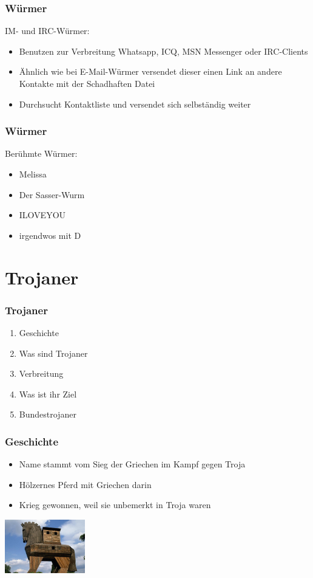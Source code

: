 \documentclass{beamer}
\begin{document}
\begin{frame}
	\frametitle{Würmer}
		\begin{block}{IM- und IRC-Würmer:}
			\begin{itemize}
				\item Benutzen zur Verbreitung Whatsapp, ICQ, MSN Messenger oder IRC-Clients
				\item Ähnlich wie bei E-Mail-Würmer versendet dieser einen Link an andere Kontakte mit der Schadhaften Datei
				\item Durchsucht Kontaktliste und versendet sich selbständig weiter
			\end{itemize}
		\end{block}
\end{frame}

\begin{frame}
	\frametitle{Würmer}
		\begin{block}{Berühmte Würmer:}
			\begin{itemize}
				\item Melissa
				\item Der Sasser-Wurm
				\item ILOVEYOU
				\item irgendwos mit D
			\end{itemize}
		\end{block}
\end{frame}


\section{Trojaner}
\begin{frame}
	\frametitle{Trojaner}
	\begin{enumerate}
		\item Geschichte 
		\item Was sind Trojaner
		\item Verbreitung
		\item Was ist ihr Ziel
		\item Bundestrojaner 
	\end{enumerate}
\end{frame}

\begin{frame}
	\frametitle{Geschichte}
	\begin{itemize}
		\item Name stammt vom Sieg der Griechen im Kampf gegen Troja
		\item Hölzernes Pferd mit Griechen darin
		\item Krieg gewonnen, weil sie unbemerkt in Troja waren
	\end{itemize}
	\flushright
	\includegraphics[width= 3.5cm]{bilder/pferd.jpg}
\end{frame}
\end{document}
